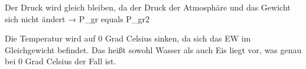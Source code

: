 Der Druck wird gleich bleiben, da der Druck der Atmosphäre und das Gewicht sich nicht ändert → P_gr equals P_gr2

Die Temperatur wird auf 0 Grad Celsius sinken, da sich das EW im Gleichgewicht befindet. Das heißt sowohl Wasser als auch Eis liegt vor, was genau bei 0 Grad Celsius der Fall ist.